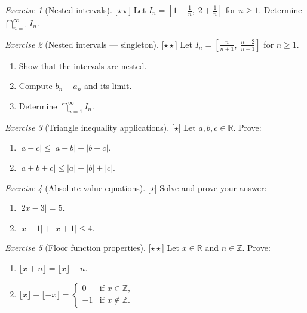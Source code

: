 \documentclass[12pt,a4paper,openany]{book}
\newcommand{\Z}{\mathbb{Z}}
\newcommand{\R}{\mathbb{R}}
\newcommand{\abs}[1]{\left\lvert #1 \right\rvert}
\theoremstyle{definition}
\theoremstyle{remark}
\newtheorem{exercise}{Exercise}[chapter]
\newcommand{\easy}{\textnormal{[$\star$]}}
\newcommand{\medium}{\textnormal{[$\star\star$]}}
\begin{document}
\begin{exercise}[Nested intervals]\label{exo:nested}\medium
Let $I_n = \left[1-\frac{1}{n},\; 2+\frac{1}{n}\right]$ for $n \geq 1$.
Determine $\bigcap_{n=1}^{\infty} I_n$.
\end{exercise}

\begin{exercise}[Nested intervals --- singleton]\label{exo:nested-single}\medium
Let $I_n = \left[\frac{n}{n+1},\; \frac{n+2}{n+1}\right]$ for $n \geq 1$.
\begin{enumerate}[label=(\alph*)]
  \item Show that the intervals are nested.
  \item Compute $b_n - a_n$ and its limit.
  \item Determine $\bigcap_{n=1}^{\infty} I_n$.
\end{enumerate}
\end{exercise}

\begin{exercise}[Triangle inequality applications]\label{exo:triangle}\easy
Let $a,b,c \in \R$.  Prove:
\begin{enumerate}[label=(\alph*)]
  \item $\abs{a-c} \leq \abs{a-b} + \abs{b-c}$.
  \item $\abs{a+b+c} \leq \abs{a}+\abs{b}+\abs{c}$.
\end{enumerate}
\end{exercise}

\begin{exercise}[Absolute value equations]\label{exo:abs-eq}\easy
Solve and prove your answer:
\begin{enumerate}[label=(\alph*)]
  \item $\abs{2x-3}=5$.
  \item $\abs{x-1}+\abs{x+1}\leq 4$.
\end{enumerate}
\end{exercise}

\begin{exercise}[Floor function properties]\label{exo:floor-props}\medium
Let $x \in \R$ and $n \in \Z$.  Prove:
\begin{enumerate}[label=(\alph*)]
  \item $\lfloor x + n \rfloor = \lfloor x \rfloor + n$.
  \item $\lfloor x \rfloor + \lfloor -x \rfloor =
    \begin{cases} 0 & \text{if } x \in \Z, \\ -1 & \text{if } x \notin \Z. \end{cases}$
\end{enumerate}
\end{exercise}
\end{document}
